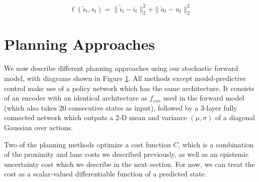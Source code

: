 \documentclass{article} %
\begin{document}
  \begin{equation}
    \ell(\tilde{s}_t, s_t) = \|\tilde{i}_t - i_t \|_2^2 + \| \tilde{u}_t - u_t \|_2^2
  \end{equation}
















  \section{Planning Approaches}
  \label{planning-methods}

  We now describe different planning approaches using our stochastic forward model, with diagrams shown in Figure \ref{planning-methods}.
  All methods except model-predictive control make use of a policy network which has the same architecture.
  It consists of an encoder with an identical architecture as $f_{enc}$ used in the forward model (which also takes 20 consecutive states as input), followed by a 3-layer fully connected network which outputs a 2-D mean and variance $(\mu, \sigma)$ of a diagonal Gaussian over actions.

  Two of the planning methods optimize a cost function $C$, which is a combination of the proximity and lane costs we described previously, as well as an epistemic uncertainty cost which we describe in the next section. For now, we can treat the cost as a scalar-valued differentiable function of a predicted state.
\end{document}
